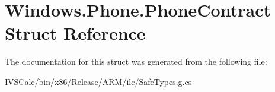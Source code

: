 \hypertarget{struct_windows_1_1_phone_1_1_phone_contract}{}\section{Windows.\+Phone.\+Phone\+Contract Struct Reference}
\label{struct_windows_1_1_phone_1_1_phone_contract}


The documentation for this struct was generated from the following file\+:\begin{DoxyCompactItemize}
\item 
I\+V\+S\+Calc/bin/x86/\+Release/\+A\+R\+M/ilc/Safe\+Types.\+g.\+cs\end{DoxyCompactItemize}
